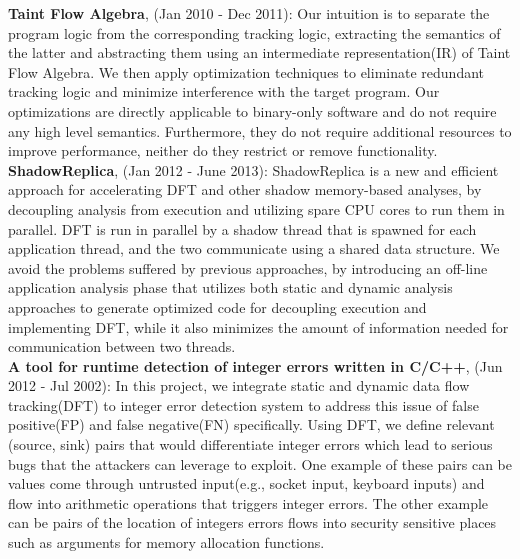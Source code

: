 \documentclass[10pt,a4]{article}
\begin{document}
\begin{small}
\begin{itemize}
  {\bf Taint Flow Algebra}, (Jan 2010 - Dec 2011): Our intuition is to separate
  the program logic from the corresponding tracking logic, extracting the
  semantics of the latter and abstracting them using an intermediate
  representation(IR) of Taint Flow Algebra. We then apply optimization
  techniques to eliminate redundant tracking logic and minimize interference
  with the target program. Our optimizations are directly applicable to
  binary-only software and do not require any high level semantics.
  Furthermore, they do not require additional resources to improve performance,
  neither do they restrict or remove functionality.\\

  {\bf ShadowReplica}, (Jan 2012 - June 2013): ShadowReplica is a new and
  efficient approach for accelerating DFT and other shadow memory-based
  analyses, by decoupling analysis from execution and utilizing spare CPU cores
  to run them in parallel. DFT is run in parallel by a shadow thread that is
  spawned for each application thread, and the two communicate using a shared
  data structure. We avoid the problems suffered by previous approaches, by
  introducing an off-line application analysis phase that utilizes both static
  and dynamic analysis approaches to generate optimized code for decoupling
  execution and implementing DFT, while it also minimizes the amount of
  information needed for communication between two threads.\\

%

  {\bf A tool for runtime detection of integer errors written in C/C++}, (Jun
  2012 - Jul 2002): In this project, we integrate static and dynamic data flow
  tracking(DFT) to integer error detection system to address this issue of false
  positive(FP) and false negative(FN) specifically. Using DFT, we define
  relevant (source, sink) pairs that would differentiate integer errors which
  lead to serious bugs that the attackers can leverage to exploit. One example
  of these pairs can be values come through untrusted input(e.g., socket input,
  keyboard inputs) and flow into arithmetic operations that triggers integer
  errors. The other example can be pairs of the location of integers errors
  flows into security sensitive places such as arguments for memory allocation
  functions. \\
\end{itemize}


\end{small}
\end{document}
